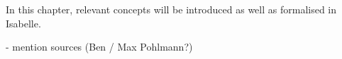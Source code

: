 %
\begin{isabellebody}%
%
%
\isadelimtheory
%
\endisadelimtheory
%
\isatagtheory
%
\endisatagtheory
{\isafoldtheory}%
%
\isadelimtheory
%
\endisadelimtheory
%
\isadelimdocument
%
\endisadelimdocument
%
\isatagdocument
%
\isamarkuptrue%
%
\endisatagdocument
{\isafolddocument}%
%
\isadelimdocument
%
\endisadelimdocument
%
\begin{isamarkuptext}%
In this chapter, relevant concepts will be introduced as well as formalised in Isabelle.%
\end{isamarkuptext}\isamarkuptrue%
%
\begin{isamarkuptext}%
- mention sources (Ben / Max Pohlmann?)%
\end{isamarkuptext}\isamarkuptrue%
%
\isadelimtheory
%
\endisadelimtheory
%
\isatagtheory
%
\endisatagtheory
{\isafoldtheory}%
%
\isadelimtheory
%
\endisadelimtheory
%
\end{isabellebody}%
\endinput
